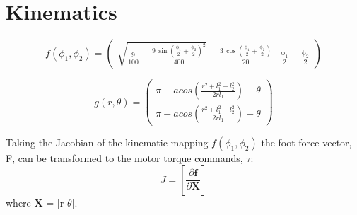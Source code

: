 \chapter{Kinematics}

\begin{equation}
f(\phi_1, \phi_2) = \left(\begin{array}{cc} \sqrt{\frac{9}{100} - \frac{9\, {\sin\!\left(\frac{\mathrm{\phi_1}}{2} + \frac{\mathrm{\phi_2}}{2}\right)}^2}{400}} - \frac{3\, \cos\!\left(\frac{\mathrm{\phi_1}}{2} + \frac{\mathrm{\phi_2}}{2}\right)}{20} & \frac{\mathrm{\phi_1}}{2} - \frac{\mathrm{\phi_2}}{2} \end{array}\right)
\end{equation}

\begin{equation}
g(r, \theta) = \left(\begin{array}{c} \pi - acos(\frac{r^2 + l_1^2 - l_2^2}{2rl_1}) + \theta \\
\pi - acos(\frac{r^2 + l_1^2 - l_2^2}{2rl_1}) - \theta  \end{array}\right)
\end{equation}


Taking the Jacobian of the kinematic mapping $f(\phi_1, \phi_2)$ the foot force vector, F, can be transformed to the motor torque commands, $\tau$:
\begin{equation}
J = \left[ \frac{\partial \textbf{f}}{\partial \textbf{X}} \right] 
\end{equation}
where \textbf{X} = [r $\theta$].

